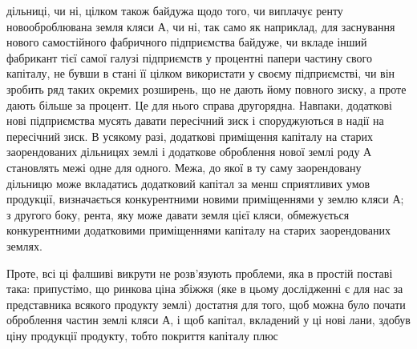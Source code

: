 дільниці, чи ні, цілком також байдужа щодо того, чи виплачує ренту новооброблювана
земля кляси $А$, чи ні, так само як наприклад, для заснування нового самостійного
фабричного підприємства байдуже, чи вкладе інший фабрикант тієї
самої галузі підприємств у процентні папери частину свого капіталу, не бувши в
стані її цілком використати у своєму підприємстві, чи він зробить ряд таких окремих
розширень, що не дають йому повного зиску, а проте дають більше за процент.
Це для нього справа другорядна. Навпаки, додаткові нові підприємства мусять
давати пересічний зиск і споруджуються в надії на пересічний зиск. В усякому
разі, додаткові приміщення капіталу на старих заорендованих дільницях
землі і додаткове оброблення нової землі роду $А$ становлять межі одне для одного.
Межа, до якої в ту саму заорендовану дільницю може вкладатись додатковий
капітал за менш сприятливих умов продукції, визначається конкурентними
новими приміщеннями у землю кляси $А$; з другого боку, рента, яку
може давати земля цієї кляси, обмежується конкурентними додатковими приміщеннями
капіталу на старих заорендованих землях.

Проте, всі ці фалшиві викрути не розв’язують проблеми, яка в простій
поставі така: припустімо, що ринкова ціна збіжжя (яке в цьому дослідженні
є для нас за представника всякого продукту землі) достатня для того, щоб
можна було почати оброблення частин землі кляси $А$, і щоб капітал, вкладений
у ці нові лани, здобув ціну продукції продукту, тобто покриття капіталу плюс
\parbreak{}  %
